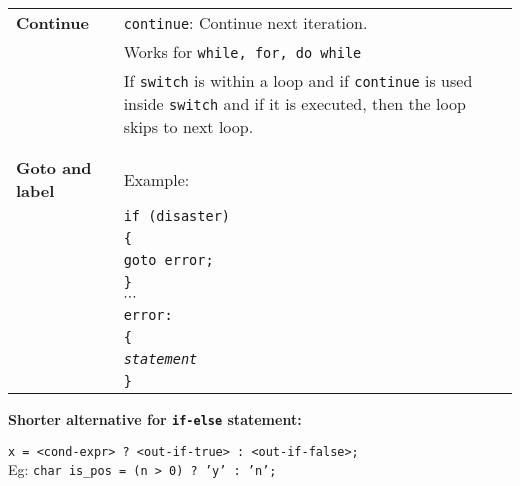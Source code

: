 \begin{minipage}{\linewidth}
\begin{tabularx}{\linewidth}{l|X}

    \textbf{Continue} & \texttt{continue}: Continue next iteration.\\
    & Works for \texttt{while, for, do while}\\
    & If \texttt{switch} is within a loop and if \texttt{continue} is used inside \texttt{switch} and if it is executed, then the loop skips to next loop.\\
    \hline\\

    \hline\\
    \textbf{Goto and label} & Example:\\
    & \texttt{if (disaster)}\\
    & \texttt{\{}\\
    & \texttt{\qquad goto error;}\\
    & \texttt{\}}\\
    & $\cdots$\\
    & \texttt{error:}\\
    & \texttt{\{}\\
    & \texttt{\qquad \textit{statement}}\\
    & \texttt{\}}\\
    \hline
\end{tabularx}

\begin{mdframed}[backgroundcolor=blue!20]
    \textbf{Shorter alternative for \texttt{if-else} statement:}

    \texttt{x = <cond-expr> ? <out-if-true> : <out-if-false>;}\\
    Eg: \texttt{char is\_pos = (n > 0) ? 'y' : 'n';}\\
\end{mdframed}

\end{minipage}

\vfill \null
\columnbreak
